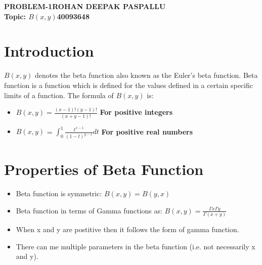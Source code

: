 \documentclass{article}
\begin{document}
\noindent
\Large\textbf{PROBLEM-1}\hfill\textbf{ROHAN DEEPAK PASPALLU}\\
\textbf{Topic: $B(x,y)$}\hfill\textbf{40093648}

\section{Introduction}
    $B(x,y)$ denotes the beta function also known as the Euler’s beta function.
    Beta function is a function which is defined for the values defined in a certain specific limits of a function.
    The formula of \textbf{$B(x,y)$} is:
    \begin{itemize}
        \item $B(x,y) = \frac{(x-1)! (y-1)!}{(x+y-1)!}$ \textbf{For positive integers}\cite{wiki}
        \item $B(x,y)$ = $\int_{0}^{1} \frac{t^{x-1}}{(1-t)^{y-1}} dt$ \textbf{For positive real numbers}
    \end{itemize}

\section{Properties of Beta Function}
    \begin{itemize}[noitemsep]
        \item Beta function is symmetric: $B(x,y) = B(y,x)$
        \item Beta function in terms of Gamma functions as:
            $B(x,y)=\frac{\Gamma x \Gamma y}{\Gamma (x+y)}$
        \item When x and y are postitive then it follows the form of gamma function.
        \item There can me multiple parameters in the beta function (i.e. not necessarily x and y).
    \end{itemize}
    
\end{document}
